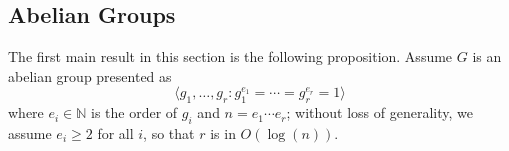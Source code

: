 

\subsection{Abelian Groups}\label{ssec:proj_abelian}

The first main result in this section is the following proposition.
Assume $G$ is an abelian group presented as 
$$ \langle g_1, \ldots , g_r: g_{1}^{e_1} = \cdots = g_{r}^{e_r} = 1
\rangle$$ where $ e_i \in \mathbb{N}$ is the order of $g_i$ and $n =
e_1 \cdots e_r$; without loss of generality, we assume $e_i \ge 2$ for
all $i$, so that $r$ is in $O(\log(n))$. 

